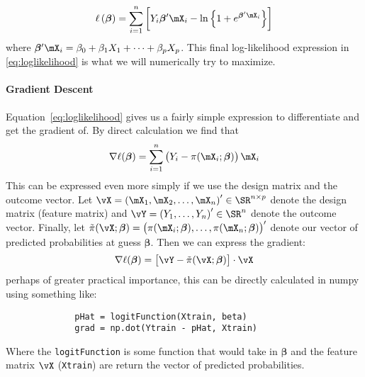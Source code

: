 \documentclass[10pt]{article}
\begin{document}
\begin{equation}
	\label{eq:loglikelihood}
	\ell\left(\boldsymbol{\beta}\right) = \sum_{i=1}^n \left[ Y_i\boldsymbol{\beta}'\mX_i -\ln\left\{1 + e^{\boldsymbol{\beta}'\mX_i}\right\}\right]
\end{equation}
where \(\boldsymbol{\beta}'\mX_i = \beta_0 + \beta_1X_1 + \dots + \beta_p X_p\). This final log-likelihood expression in \eqref{eq:loglikelihood} is what we will numerically try to maximize. 

\paragraph{Gradient Descent}

Equation~\eqref{eq:loglikelihood} gives us a fairly simple expression to differentiate and get the gradient of. By direct calculation we find that 
\begin{equation}
	\label{eq:ellGrad}
	\nabla \ell(\boldsymbol{\beta}) = \sum_{i=1}^n \left(Y_i -\pi(\mX_i; \boldsymbol{\beta})\right)\mX_i
\end{equation}
This can be expressed even more simply if we use the design matrix and the outcome vector. Let \(\vX = \left(\mX_1, \mX_2, \dots, \mX_n\right)' \in \SR^{n \times p}\) denote the design matrix (feature matrix) and \(\vY = \left(Y_1, \dots, Y_n\right)' \in \SR^n\) denote the outcome vector. Finally, let \(\tilde{\pi}(\vX;\boldsymbol{\beta}) = \left(\pi(\mX_i;\boldsymbol{\beta}),\dots, \pi(\mX_n;\boldsymbol{\beta})\right)'\) denote our vector of predicted probabilities at guess \(\boldsymbol{\beta}\). Then we can express the gradient: 
\begin{equation}
	\label{eq:matGrad}
	\nabla \ell(\boldsymbol{\beta}) = \left[\vY -\tilde\pi(\vX;\boldsymbol{\beta}) \right]\cdot\vX
\end{equation}
perhaps of greater practical importance, this can be directly calculated in numpy using something like:
\begin{figure}[h!]
	\centering
	\begin{BVerbatim}
		pHat = logitFunction(Xtrain, beta)
		grad = np.dot(Ytrain - pHat, Xtrain)
	\end{BVerbatim}
\end{figure}

Where the \verb|logitFunction| is some function that would take in \(\boldsymbol{\beta}\) and the feature matrix \(\vX\) (\verb|Xtrain|) are return the vector of predicted probabilities.
\end{document}
